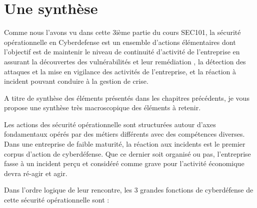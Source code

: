 %


\section{Une synthèse}
Comme nous l'avons vu dans cette 3ième partie du cours SEC101,  la sécurité opérationnelle en Cyberdefense est un ensemble d'actions  élémentaires dont l'objectif est  de maintenir le niveau de continuité d'activité de l'entreprise en assurant la découvertes des vulnérabilités et leur remédiation , la détection des attaques et la mise en vigilance des activités de l'entreprise, et la réaction à incident pouvant conduire à la gestion de crise.

A titre de synthèse des éléments présentés dans les chapitres précédents, je vous propose une synthèse très macroscopique des éléments à retenir.

Les actions des sécurité opérationnelle sont structurées autour d'axes  fondamentaux opérés par des métiers différents avec des compétences diverses. Dans une entreprise de faible maturité, la réaction aux incidents est le premier corpus d'action de cyberdéfense. Que ce dernier soit organisé ou pas, l'entreprise fasse à un incident perçu et considéré comme grave pour l'activité économique devra ré-agir et agir.

Dans l'ordre logique de leur rencontre, les 3 grandes fonctions de cyberdéfense de cette sécurité opérationnelle sont  :

